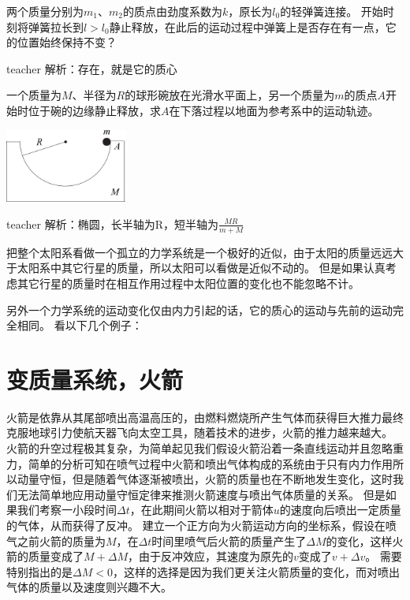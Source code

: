 \begin{example}
	两个质量分别为$m_1$、$m_2$的质点由劲度系数为$k$，原长为$l_0$的轻弹簧连接。
	开始时刻将弹簧拉长到$l>l_0$静止释放，在此后的运动过程中弹簧上是否存在有一点，它的位置始终保持不变？
	\begin{taggedblock}{teacher}
		\newline
		解析：存在，就是它的质心
	\end{taggedblock}
\end{example}


\begin{example}
	一个质量为$M$、半径为$R$的球形碗放在光滑水平面上，另一个质量为$m$的质点$A$开始时位于碗的边缘静止释放，求$A$在下落过程以地面为参考系中的运动轨迹。
		\begin{flushright}
			\includegraphics[width = 0.3\textwidth]{images/momentum-6.pdf} 
		\end{flushright}
	\begin{taggedblock}{teacher}
		\noindent
		解析：椭圆，长半轴为R，短半轴为$\frac{MR}{m+M}$
	\end{taggedblock}
\end{example}

把整个太阳系看做一个孤立的力学系统是一个极好的近似，由于太阳的质量远远大于太阳系中其它行星的质量，所以太阳可以看做是近似不动的。
但是如果认真考虑其它行星的质量时在相互作用过程中太阳位置的变化也不能忽略不计。


另外一个力学系统的运动变化仅由内力引起的话，它的质心的运动与先前的运动完全相同。
看以下几个例子：




 


\section{变质量系统，火箭}
火箭是依靠从其尾部喷出高温高压的，由燃料燃烧所产生气体而获得巨大推力最终克服地球引力使航天器飞向太空工具，随着技术的进步，火箭的推力越来越大。
火箭的升空过程极其复杂，为简单起见我们假设火箭沿着一条直线运动并且忽略重力，简单的分析可知在喷气过程中火箭和喷出气体构成的系统由于只有内力作用所以动量守恒，但是随着气体逐渐被喷出，火箭的质量也在不断地发生变化，这时我们无法简单地应用动量守恒定律来推测火箭速度与喷出气体质量的关系。
但是如果我们考察一小段时间$\Delta t $，在此期间火箭以相对于箭体$u$的速度向后喷出一定质量的气体，从而获得了反冲。
建立一个正方向为火箭运动方向的坐标系，假设在喷气之前火箭的质量为$M$，在$\Delta t$时间里喷气后火箭的质量产生了$\Delta M$的变化，这样火箭的质量变成了$M+\Delta M$，由于反冲效应，其速度为原先的$v$变成了$v+\Delta v$。
需要特别指出的是$\Delta M<0$，这样的选择是因为我们更关注火箭质量的变化，而对喷出气体的质量以及速度则兴趣不大。

